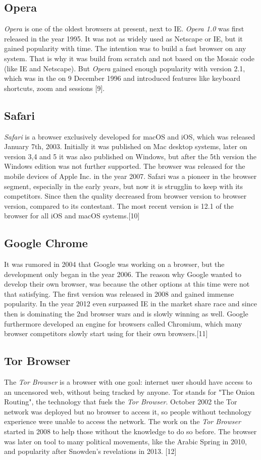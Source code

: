 \documentclass[runningheads]{llncs}
\begin{document}
		\subsection{Opera}
		\textit{Opera} is one of the oldest browsers at present, next to IE. \textit{Opera 1.0} was first released in the year 1995. It was not as widely used as Netscape or IE, but it gained popularity with time. The intention was to build a fast browser on any system. That is why it was build from scratch and not based on the Mosaic code (like IE and Netscape). But \textit{Opera} gained enough popularity with version 2.1, which was in the on 9 December 1996 and introduced features like keyboard shortcuts, zoom and sessions [9].
		\subsection{Safari}
		\textit{Safari} is a browser exclusively developed for macOS and iOS, which was released January 7th, 2003. Initially it was published on Mac desktop systems, later on version 3,4 and 5 it was also published on Windows, but after the 5th version the Windows edition was not further supported. The browser was released for the mobile devices of Apple Inc. in the year 2007. Safari was a pioneer in the browser segment, especially in the early years, but now it is strugglin to keep with its competitors. Since then the quality decreased from browser version to browser version, compared to its contestant. The most recent version is 12.1 of the browser for all iOS and macOS systems.[10]
		\subsection{Google Chrome}
		It was rumored in 2004 that Google was working on a browser, but the development only began in the year 2006. The reason why Google wanted to develop their own browser, was because the other options at this time were not that satisfying. The first version was released in 2008 and gained immense popularity. In the year 2012 even surpassed IE in the market share race and since then is dominating the 2nd browser wars and is slowly winning as well. Google furthermore developed an engine for browsers called Chromium, which many browser competitors slowly start using for their own browsers.[11]
		\subsection{Tor Browser}
		The \textit{Tor Browser} is a browser with one goal: internet user should have access to an uncensored web, without being tracked by anyone. Tor stands for "The Onion Routing", the technology that fuels the \textit{Tor Browser}. October 2002 the Tor network was deployed but no browser to access it, so people without technology experience were unable to access the network. The work on the \textit{Tor Browser} started in 2008 to help those without the knowledge to do so before. The browser was later on tool to many political movements, like the Arabic Spring in 2010, and popularity after Snowden's revelations in 2013. [12]
\end{document}
